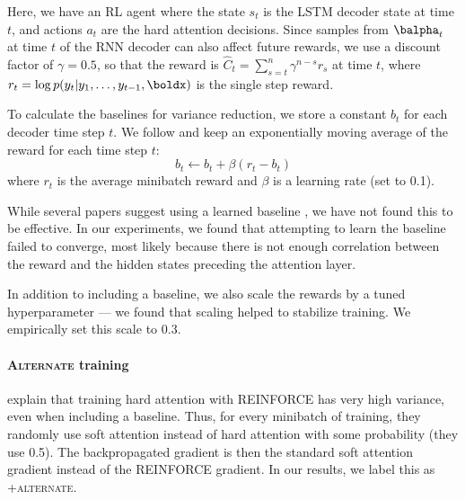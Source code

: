 \documentclass[12pt]{report}
\begin{document}
Here, we have an RL agent where the state $s_t$ is the LSTM decoder state at time $t$, and actions $a_t$ are the hard attention decisions.
Since samples from $\balpha_t$ at time $t$ of the RNN decoder can also affect future rewards, we use a discount factor of $\gamma = 0.5$, so that the reward is $\hat{C}_t = \sum_{s = t}^n \gamma^{n-s}r_s$ at time $t$, where $r_t = \log p(y_t | y_1, \ldots, y_{t-1}, \boldx)$ is the single step reward.

To calculate the baselines for variance reduction, we store a constant $b_t$ for each decoder time step $t$. We follow \citet{xu2015captioning} and keep an exponentially moving average of the reward for each time step $t$:
\begin{equation}
b_t \gets b_t + \beta (r_t - b_t)
\end{equation}
where $r_t$ is the average minibatch reward and $\beta$ is a learning rate (set to 0.1).

While several papers suggest using a learned baseline \citep[e.g.][]{mnih2014visualattention, ranzato2015}, we have not found this to be effective. In our experiments, we found that attempting to learn the baseline failed to converge, most likely because there is not enough correlation between the reward and the hidden states preceding the attention layer.

In addition to including a baseline, we also scale the rewards by a tuned hyperparameter --- we found that scaling helped to stabilize training. We empirically set this scale to 0.3.






\paragraph{\textsc{Alternate} training} \citet{xu2015captioning} explain that training hard attention with REINFORCE has very high variance, even when including a baseline. Thus, for every minibatch of training, they randomly use soft attention instead of hard attention with some probability (they use 0.5).
The backpropagated gradient is then the standard soft attention gradient instead of the REINFORCE gradient. In our results, we label this as \textsc{+alternate}.
\end{document}

